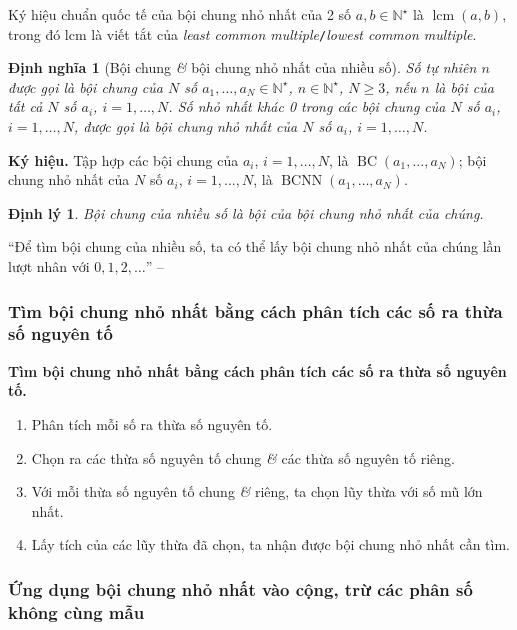 \documentclass{article}
\numberwithin{equation}{section}
\newtheorem{definition}{Định nghĩa}[section]
\newtheorem{theorem}{Định lý}[section]
\begin{document}
Ký hiệu chuẩn quốc tế của bội chung nhỏ nhất của 2 số $a,b\in\mathbb{N}^\star$ là $\operatorname{lcm}(a,b)$, trong đó lcm là viết tắt của \textit{least common multiple}\texttt{/}\textit{lowest common multiple}.

\begin{definition}[Bội chung \textit{\&} bội chung nhỏ nhất của nhiều số]
	Số tự nhiên $n$ được gọi là \emph{bội chung} của $N$ số $a_1,\ldots,a_N\in\mathbb{N}^\star$, $n\in\mathbb{N}^\star$, $N\ge 3$, nếu $n$ là bội của tất cả $N$ số $a_i$, $i = 1,\ldots,N$. Số nhỏ nhất khác 0 trong các bội chung của $N$ số $a_i$, $i = 1,\ldots,N$, được gọi là \emph{bội chung nhỏ nhất} của $N$ số $a_i$, $i = 1,\ldots,N$.
\end{definition}
\noindent\textbf{Ký hiệu.} Tập hợp các bội chung của $a_i$, $i = 1,\ldots,N$, là $\operatorname{BC}(a_1,\ldots,a_N)$; bội chung nhỏ nhất của $N$ số $a_i$, $i = 1,\ldots,N$, là $\operatorname{BCNN}(a_1,\ldots,a_N)$.

\begin{theorem}
	Bội chung của nhiều số là bội của bội chung nhỏ nhất của chúng.
\end{theorem}
``Để tìm bội chung của nhiều số, ta có thể lấy bội chung nhỏ nhất của chúng lần lượt nhân với $0,1,2,\ldots$'' -- \cite[p. 55]{Thai_Anh_Dat_Ha_Loan_Nam_Quang_Toan_6_tap_1}

\subsubsection{Tìm bội chung nhỏ nhất bằng cách phân tích các số ra thừa số nguyên tố}

\begin{tcolorbox}
	\textbf{Tìm bội chung nhỏ nhất bằng cách phân tích các số ra thừa số nguyên tố.}
	\begin{enumerate}
		\item Phân tích mỗi số ra thừa số nguyên tố.
		\item Chọn ra các thừa số nguyên tố chung \textit{\&} các thừa số nguyên tố riêng.
		\item Với mỗi thừa số nguyên tố chung \textit{\&} riêng, ta chọn lũy thừa với số mũ lớn nhất.
		\item Lấy tích của các lũy thừa đã chọn, ta nhận được bội chung nhỏ nhất cần tìm.
	\end{enumerate}
\end{tcolorbox}

\subsubsection{Ứng dụng bội chung nhỏ nhất vào cộng, trừ các phân số không cùng mẫu}
\end{document}
